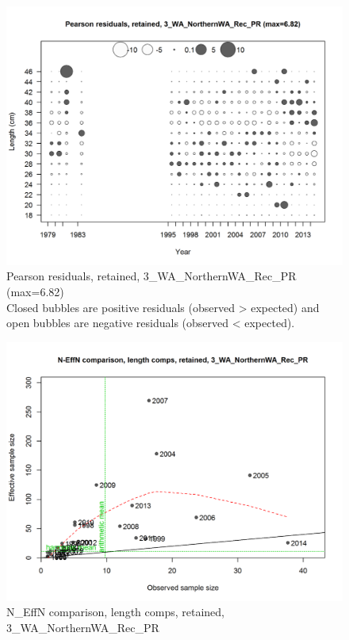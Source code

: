 \documentclass[12pt,]{article}
\begin{document}
\begin{figure}[htbp]
\centering
\includegraphics{./r4ss/plots_mod1/comp_lenfit_residsflt3mkt2.png}
\caption{Pearson residuals, retained, 3\_WA\_NorthernWA\_Rec\_PR
(max=6.82)\\
Closed bubbles are positive residuals (observed \textgreater{} expected)
and open bubbles are negative residuals (observed \textless{} expected).
\label{fig:mod1_6_comp_lenfit_residsflt3mkt2}}
\end{figure}

\begin{figure}[htbp]
\centering
\includegraphics{./r4ss/plots_mod1/comp_lenfit_sampsize_flt3mkt2.png}
\caption{N\_EffN comparison, length comps, retained,
3\_WA\_NorthernWA\_Rec\_PR
\label{fig:mod1_7_comp_lenfit_sampsize_flt3mkt2}}
\end{figure}
\end{document}
